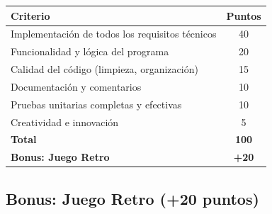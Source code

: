 \documentclass[12pt,a4paper]{article}
\begin{document}
\begin{center}
\begin{tabular}{|l|c|}
\hline
\textbf{Criterio} & \textbf{Puntos} \\
\hline
Implementación de todos los requisitos técnicos & 40 \\
Funcionalidad y lógica del programa & 20 \\
Calidad del código (limpieza, organización) & 15 \\
Documentación y comentarios & 10 \\
Pruebas unitarias completas y efectivas & 10 \\
Creatividad e innovación & 5 \\
\hline
\textbf{Total} & \textbf{100} \\
\hline
\textbf{Bonus: Juego Retro} & \textbf{+20} \\
\hline
\end{tabular}
\end{center}

\subsection{Bonus: Juego Retro (+20 puntos)}
\end{document}
